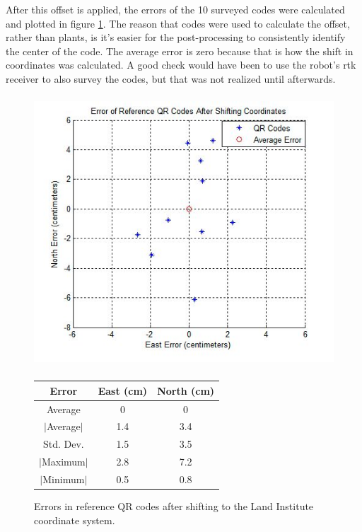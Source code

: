 After this offset is applied, the errors of the 10 surveyed codes were calculated and plotted in figure \ref{figure:code_errors}.  The reason that codes were used to calculate the offset, rather than plants, is it's easier for the post-processing to consistently identify the center of the code.  The average error is zero because that is how the shift in coordinates was calculated.  A good check would have been to use the robot's \ac{rtk} receiver to also survey the codes, but that was not realized until afterwards.

  \begin{figure}
	\centering
    \includegraphics[height=4in]{figures/code_errors.jpg}
    \newline
    \newline
    \centering
    \begin{tabular}[c]{|c|c|c|}
       \hline
        Error & East (cm) & North (cm) \\ 
        \hline
        Average   & 0 & 0             \\
        $|$Average$|$ & 1.4 & 3.4       \\
        Std. Dev. & 1.5 & 3.5         \\
        $|$Maximum$|$   & 2.8 & 7.2       \\
        $|$Minimum$|$   & 0.5 & 0.8       \\
        \hline
    \end{tabular}
    \captionsetup{labelformat=andtable}
    \caption[Errors in reference QR codes]{Errors in reference QR codes after shifting to the Land Institute coordinate system.}
    \label{figure:code_errors}
  \end{figure}

